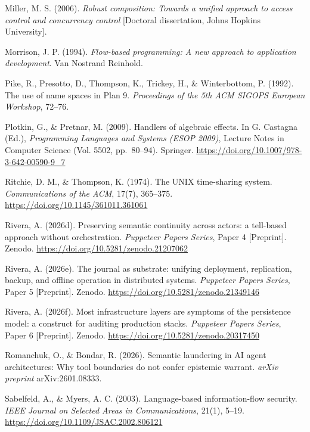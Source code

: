 \documentclass[
]{article}
\begin{document}
Miller, M. S. (2006). \emph{Robust composition: Towards a unified
approach to access control and concurrency control} {[}Doctoral
dissertation, Johns Hopkins University{]}.

Morrison, J. P. (1994). \emph{Flow-based programming: A new approach to
application development}. Van Nostrand Reinhold.

Pike, R., Presotto, D., Thompson, K., Trickey, H., \& Winterbottom, P.
(1992). The use of name spaces in Plan 9. \emph{Proceedings of the 5th
ACM SIGOPS European Workshop}, 72--76.

Plotkin, G., \& Pretnar, M. (2009). Handlers of algebraic effects. In G.
Castagna (Ed.), \emph{Programming Languages and Systems (ESOP 2009)},
Lecture Notes in Computer Science (Vol. 5502, pp.~80--94). Springer.
\url{https://doi.org/10.1007/978-3-642-00590-9_7}

Ritchie, D. M., \& Thompson, K. (1974). The UNIX time-sharing system.
\emph{Communications of the ACM}, 17(7), 365--375.
\url{https://doi.org/10.1145/361011.361061}

Rivera, A. (2026d). Preserving semantic continuity across actors: a
tell-based approach without orchestration. \emph{Puppeteer Papers
Series}, Paper 4 {[}Preprint{]}. Zenodo.
\url{https://doi.org/10.5281/zenodo.21207062}

Rivera, A. (2026e). The journal as substrate: unifying deployment,
replication, backup, and offline operation in distributed systems.
\emph{Puppeteer Papers Series}, Paper 5 {[}Preprint{]}. Zenodo.
\url{https://doi.org/10.5281/zenodo.21349146}

Rivera, A. (2026f). Most infrastructure layers are symptoms of the
persistence model: a construct for auditing production stacks.
\emph{Puppeteer Papers Series}, Paper 6 {[}Preprint{]}. Zenodo.
\url{https://doi.org/10.5281/zenodo.20317450}

Romanchuk, O., \& Bondar, R. (2026). Semantic laundering in AI agent
architectures: Why tool boundaries do not confer epistemic warrant.
\emph{arXiv preprint} arXiv:2601.08333.

Sabelfeld, A., \& Myers, A. C. (2003). Language-based information-flow
security. \emph{IEEE Journal on Selected Areas in Communications},
21(1), 5--19. \url{https://doi.org/10.1109/JSAC.2002.806121}
\end{document}
